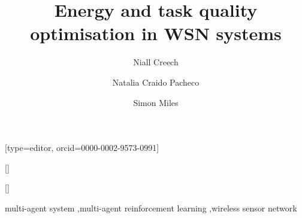 \documentclass[a4paper,fleqn]{cas-sc}
\begin{document}
	\let\WriteBookmarks\relax
	\def\floatpagepagefraction{1}
	\def\textpagefraction{.001}
	
	\title [mode = title]{Energy and task quality optimisation in WSN systems}                      
	
	\author[1]{Niall Creech}[type=editor,	orcid=0000-0002-9573-0991]
	
	\author[1]{Natalia Craido Pacheco}[]

	\author[1]{Simon Miles}[]

	\address[1]{Department of Informatics, King's College London, Bush House, Strand Campus, 30, Aldwych, London WC2B 4BG}

	
	
	
	\begin{keywords}
		multi-agent system
		\sep multi-agent reinforcement learning
		\sep wireless sensor network
	\end{keywords}

	
	
	
	\newtheorem{thm}{Theorem}
	\maketitle
	
	
	
	
	
	
	
	
	
	
	
	
	
	
	
	
	
	
	
	\begin{appendix}
	\end{appendix}
				
\end{document}
